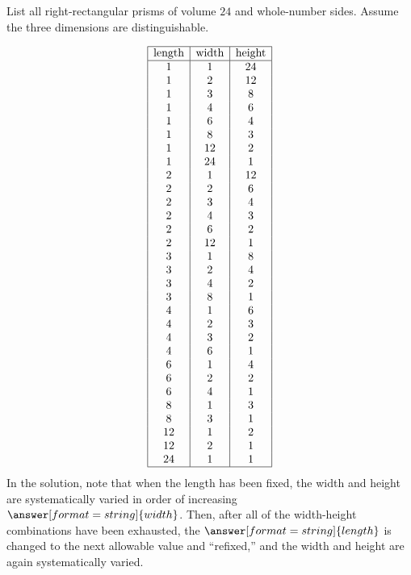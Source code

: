 \documentclass[nooutcomes]{ximera}
\begin{document}
\newpage
\begin{problem}
List all right-rectangular prisms of volume $24$ and whole-number sides.  Assume the three dimensions are distinguishable. 
\begin{solution}
\[
\begin{array}{|c|c|c|}
\hline
\text{length} & \text{width} & \text{height} \\ 
\hline
1 & 1 & 24 \\
1 & 2 & 12 \\
1 & 3 & 8 \\
1 & 4 & 6 \\
1 & 6 & 4 \\
1 & 8 & 3 \\
1 & 12 & 2 \\
1 & 24 & 1 \\
2 & 1 & 12 \\
2 & 2 & 6 \\
2 & 3 & 4 \\
2 & 4 & 3 \\
2 & 6 & 2 \\
2 & 12 & 1 \\
3 & 1 & 8 \\
3 & 2 & 4 \\
3 & 4 & 2 \\
3 & 8 & 1 \\
4 & 1 & 6 \\
4 & 2 & 3 \\
4 & 3 & 2 \\
4 & 6 & 1 \\
6 & 1 & 4 \\
6 & 2 & 2 \\
6 & 4 & 1 \\
8 & 1 & 3 \\
8 & 3 & 1 \\
12 & 1 & 2 \\
12 & 2 & 1 \\
24 & 1 & 1 \\
\hline
\end{array}
\]
In the solution, note that when the length has been fixed, the width and height are systematically varied in order of increasing $\answer[format=string]{width}$. Then, after all of the width-height combinations have been exhausted, the 
$\answer[format=string]{length}$ is changed to the next allowable value and ``refixed,'' and the width and height are again systematically varied.  
\end{solution}
\end{problem}
\end{document}
